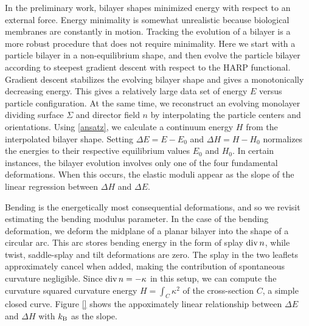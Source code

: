 In the preliminary work, bilayer shapes minimized energy with respect to an external force. Energy minimality is somewhat unrealistic because
biological membranes are constantly in motion. Tracking the evolution of a bilayer is a more robust procedure that does not require minimality.
Here we start with a particle bilayer in a non-equilibrium shape, and then evolve the particle bilayer according to steepest gradient descent with respect to the
HARP functional. Gradient descent stabilizes the evolving bilayer shape and gives a monotonically decreasing energy. This gives a relatively large
data set of energy $E$ versus particle configuration. At the same time, we reconstruct an evolving monolayer dividing surface $\Sigma$ and director field $n$ by
interpolating the particle centers and orientations. Using \eqref{ansatz}, we calculate a continuum energy $H$ from the interpolated
bilayer shape. Setting $\Delta E = E - E_0$ and $\Delta H = H - H_0$ normalizes the energies to their respective equilibrium values $E_0$ and $H_0$.
In certain instances, the bilayer evolution involves only one of the four fundamental deformations.
When this occurs, the elastic moduli appear as the slope of the linear regression between $\Delta H$ and $\Delta E$. 

Bending is the energetically most consequential deformations,
and so we revisit estimating the bending modulus parameter. 
In the case of the bending deformation, we deform the midplane of a planar bilayer into the shape of a circular arc.
This arc stores bending energy in the form of splay $\operatorname{div}{n}$, while twist, saddle-splay and tilt deformations are zero.
The splay in the two leaflets approximately cancel when added, making the contribution of spontaneous curvature negligible.
Since $\operatorname{div}{n} = -\kappa$ in this setup, we can compute the curvature squared curvature energy 
$H = \int_C \kappa^2$ of the cross-section $C$, a simple closed curve. Figure \ref{} shows the appoximately linear
relationship between $\Delta E$ and $\Delta H$ with $k_{\mathrm{B}}$ as the slope.

